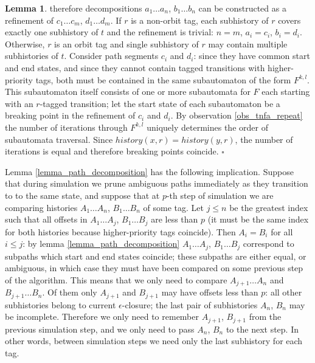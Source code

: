 \documentclass{article}
\newcommand{\Xeq}{\!=\!}
\theoremstyle{definition}
\newtheorem{XLem}{Lemma}
\begin{document}
\begin{multicols}{2}
\begin{XLem}
therefore decompositions $a_1 \dots a_n$, $b_1 \dots b_n$ can be constructed as a refinement of $c_1 \dots c_m$, $d_1 \dots d_m$.
If $r$ is a non-orbit tag, each subhistory of $r$ covers exactly one subhistory of $t$
and the refinement is trivial: $n \Xeq m$, $a_i \Xeq c_i$, $b_i \Xeq d_i$.
Otherwise, $r$ is an orbit tag and single subhistory of $r$ may contain multiple subhistories of $t$.
Consider path segments $c_i$ and $d_i$:
since they have common start and end states, and since they cannot contain tagged transitions with higher-priority tags,
both must be contained in the same subautomaton of the form $F^{k,l}$.
This subautomaton itself consists of one or more subautomata for $F$ each starting with an $r$-tagged transition;
let the start state of each subautomaton be a breaking point in the refinement of $c_i$ and $d_i$.
By observation \ref{obs_tnfa_repeat} the number of iterations through $F^{k,l}$ uniquely determines the order of subautomata traversal.
Since $history(x, r) \Xeq history(y, r)$, the number of iterations is equal and
therefore breaking points coincide.
$\square$
\end{XLem}

Lemma \ref{lemma_path_decomposition} has the following implication.
Suppose that during simulation we prune ambiguous paths immediately as they transition to to the same state,
and suppose that
at $p$-th step of simulation we are comparing histories $A_1 \dots A_n$, $B_1 \dots B_n$ of some tag.
Let $j \!\leq\! n$ be the greatest index such that all offsets in $A_1 \dots A_j$, $B_1 \dots B_j$ are less than $p$
(it must be the same index for both histories because higher-priority tags coincide).
Then $A_i \Xeq B_i$ for all $i \!\leq\! j$:
by lemma \ref{lemma_path_decomposition} $A_1 \dots A_j$, $B_1 \dots B_j$
correspond to subpaths which start and end states coincide;
these subpaths are either equal, or ambiguous, in which case they must have been compared on some previous step of the algorithm.
This means that we only need to compare $A_{j+1} \dots A_n$ and $B_{j+1} \dots B_n$.
Of them only $A_{j+1}$ and $B_{j+1}$ may have offsets less than $p$:
all other subhistories belong to current $\epsilon$-closure;
the last pair of subhistories $A_n$, $B_n$ may be incomplete.
Therefore we only need to remember $A_{j+1}$, $B_{j+1}$ from the previous simulation step,
and we only need to pass $A_n$, $B_n$ to the next step.
In other words, between simulation steps we need only the last subhistory for each tag.
\\


\end{multicols}
\end{document}
